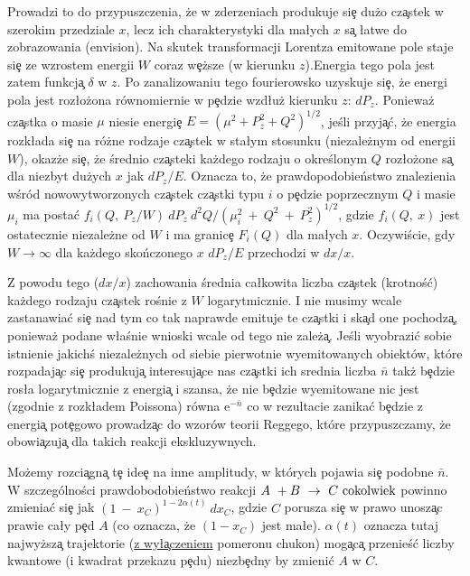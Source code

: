Prowadzi to do przypuszczenia, \.{z}e w zderzeniach produkuje si\c{e}  du\.{z}o
cz\c{a}stek
w szerokim przedziale $x$, lecz ich charakterystyki dla ma\l ych $x$ s\c{a}
\l atwe do zobrazowania (envision).
Na skutek transformacji Lorentza emitowane pole staje si\c{e} ze wzrostem energii $W$
 coraz w\c{e}\.{z}sze (w kierunku $z$).Energia tego pola jest zatem funkcj\c{a} $\delta$
w $z$. Po zanalizowaniu tego fourierowsko uzyskuje si\c{e}, \.{z}e energi pola jest
roz\l o\.{z}ona r\'{o}wnomiernie w p\c{e}dzie wzd\l u\.{z} kierunku $z$: $dP_z$.
Poniewa\.{z} cz\c{a}stka o masie $\mu$ niesie energi\c{e} $E=(\mu^2+P_z^2+Q^2)^{1/2}$,
je\'{s}li przyj\c{a}\'{c}, \.{z}e energia rozk\l ada si\c{e} na r\'{o}\.{z}ne rodzaje
cz\c{a}stek w sta\l ym stosunku (niezale\.{z}nym od energii $W$),
okaz\.{z}e si\c{e}, \.{z}e \'{s}rednio cz\c{a}steki
ka\.{z}dego rodzaju o okre\'{s}lonym $Q$ roz\l o\.{z}one s\c{a} dla niezbyt du\.{z}ych $x$
jak $dP_z/E$.
Oznacza to, \.{z}e prawdopodobie\'{n}stwo znalezienia w\'{s}r\'{o}d nowowytworzonych cz\c{a}stek
cz\c{a}stki typu $i$ o p\c{e}dzie poprzecznym $Q$ i masie $\mu_i$ ma posta\'{c}
\mbox{$
{f_i\left(Q,\:P_z/W\right)\:dP_z\:d^2Q / \left( \mu_i^2\:+\:Q^2\:+\:P_z^2 \right)^{1/2}}$},
gdzie $f_i(Q,\:x)$ jest ostatecznie niezale\.{z}ne od $W$ i ma granic\c{e}
$F_i(Q)$ dla ma\l ych $x$. Oczywi\'{s}cie,
gdy $W \rightarrow \infty$ dla ka\.{z}dego sko\'{n}czonego $x$
$dP_z/E$ przechodzi w $dx/x$.

Z powodu tego ($dx/x$) zachowania \'{s}rednia ca\l kowita liczba cz\c{a}stek
(krotno\'{s}\'{c}) ka\.{z}dego rodzaju cz\c{a}stek ro\'{s}nie z $W$ logarytmicznie.
I nie musimy wcale zastanawia\'{c} si\c{e} nad tym co tak naprawde emituje te cz\c{a}stki
i sk\c{a}d one pochodz\c{a}, poniewa\.{z} podane w\l a\'{s}nie wnioski wcale od tego
nie zale\.{z}\c{a}.
Je\'{s}li wyobrazi\'{c} sobie istnienie jakich\'{s} niezale\.{z}nych od siebie
pierwotnie wyemitowanych
obiekt\'{o}w, kt\'{o}re rozpadaj\c{a}c si\c{e} produkuj\c{a} interesuj\c{a}ce nas
cz\c{a}stki ich srednia liczba $\bar n$ tak\.{z} b\c{e}dzie ros\l a logarytmicznie
z energi\c{a} i szansa, \.{z}e nie b\c{e}dzie wyemitowane nic jest (zgodnie z rozk\l adem
Poissona) r\'{o}wna e$^{- \bar n}$ co w rezultacie zanika\'{c} b\c{e}dzie
z energi\c{a} pot\c{e}gowo prowadz\c{a}c do wzor\'{o}w teorii Reggego, kt\'{o}re
przypuszczamy, \.{z}e obowi\c{a}zuj\c{a} dla takich reakcji ekskluzywnych.

Mo\.{z}emy rozci\c{a}gn\c{a} t\c{e} ide\c{e} na inne amplitudy, w kt\'{o}rych pojawia si\c{e}
podobne $\bar n$. W szczeg\'{o}lno\'{s}ci prawdobodobie\'{n}stwo reakcji
\mbox{$A~+B~\rightarrow ~C~{\rm cokolwiek}$} powinno zmienia\'{c} si\c{e} jak
\mbox{$
    \left(   1~-~x_C \right)^{1-2\alpha(t)}\:dx_C
    $},
gdzie $C$ porusza si\c{e} w prawo unosz\c{a}c prawie ca\l y p\c{e}d $A$ (co oznacza, \.{z}e
$(1-x_C)$ jest ma\l e). $\alpha(t)$ oznacza tutaj najwy\.{z}sz\c{a} trajektorie
(\underline{z wy\l \c{a}czeniem} pomeronu chukon)
mog\c{a}c\c{a} przenie\'{s}\'{c} liczby kwantowe
(i kwadrat przekazu p\c{e}du) niezb\c{e}dny by zmieni\'{c} $A$ w $C$.

